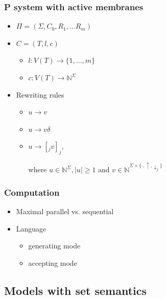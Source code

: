     \begin{frame}[t]\frametitle{P system with active membranes}
    \begin{itemize}
      \item $\Pi = (\Sigma, C_0, R_1, \ldots R_m)$
      \pause
      \item $C = (T, l, c)$
      \begin{itemize}
        \item $l: V(T) \rightarrow \{1, \ldots, m\}$
        \item $c: V(T) \rightarrow \mathbb{N}^\Sigma$
      \end{itemize}
      \pause
      \item Rewriting rules
      \begin{itemize}
        \item $u\rightarrow v$
        \item $u\rightarrow v\delta$
        \item $u\rightarrow [_j v]_j$,

        where $u \in \mathbb{N}^\Sigma, |u|\geq 1$ and $v\in \mathbb{N}^{\Sigma\times\{\cdot, \uparrow, \downarrow_{j}\}}$
      \end{itemize}

    \end{itemize}
    \end{frame}
    \note{}

    \begin{frame}[t]\frametitle{Computation}
      \begin{itemize}
        \item Maximal parallel vs. sequential
        \pause
        \item Language
        \begin{itemize}
          \item generating mode
          \item accepting mode
        \end{itemize}
      \end{itemize}

    \end{frame}
    \note{}


  \subsection{Models with set semantics} %
  \label{sub:models_with_set_semantics}
    
